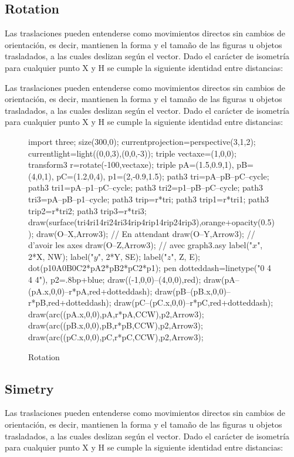 \documentclass[a4paper]{book}
\begin{document}
 \subsection{Rotation}

 Las traslaciones pueden entenderse como movimientos directos sin cambios de orientación, es decir, mantienen la forma y el tamaño de las figuras u objetos trasladados, a las cuales deslizan según el vector. Dado el carácter de isometría para cualquier punto X y H se cumple la siguiente identidad entre distancias:

 Las traslaciones pueden entenderse como movimientos directos sin cambios de orientación, es decir, mantienen la forma y el tamaño de las figuras u objetos trasladados, a las cuales deslizan según el vector. Dado el carácter de isometría para cualquier punto X y H se cumple la siguiente identidad entre distancias:

\begin{figure}[!ht]
	\centering
	\begin{asy}
	import three;
	size(300,0);
	currentprojection=perspective(3,1,2);
	currentlight=light((0,0,3),(0,0,-3));
	triple vectaxe=(1,0,0);
	transform3 r=rotate(-100,vectaxe);
	triple pA=(1.5,0.9,1), pB=(4,0,1), pC=(1.2,0,4), p1=(2,-0.9,1.5);
	path3 tri=pA--pB--pC--cycle;
	path3 tri1=pA--p1--pC--cycle;
	path3 tri2=p1--pB--pC--cycle;
	path3 tri3=pA--pB--p1--cycle;
	path3 trip=r*tri;
	path3 trip1=r*tri1;
	path3 trip2=r*tri2;
	path3 trip3=r*tri3;
	draw(surface(tri^^tri1^^tri2^^tri3^^trip^^trip1^^trip2^^trip3),orange+opacity(0.5));
	draw(O--X,Arrow3); // En attendant
	draw(O--Y,Arrow3); // d’avoir les axes
	draw(O--Z,Arrow3); // avec graph3.asy
	label("$x$", 2*X, NW);
	label("$y$", 2*Y, SE);
	label("$z$", Z, E);
	dot(p1^^pA^^pB^^pC^^r*pA^^r*pB^^r*pC^^r*p1);
	pen dotteddash=linetype("0 4 4 4"),
	p2=.8bp+blue;
	draw((-1,0,0)--(4,0,0),red);
	draw(pA--(pA.x,0,0)--r*pA,red+dotteddash);
	draw(pB--(pB.x,0,0)--r*pB,red+dotteddash);
	draw(pC--(pC.x,0,0)--r*pC,red+dotteddash);
	draw(arc((pA.x,0,0),pA,r*pA,CCW),p2,Arrow3);
	draw(arc((pB.x,0,0),pB,r*pB,CCW),p2,Arrow3);
	draw(arc((pC.x,0,0),pC,r*pC,CCW),p2,Arrow3);
	\end{asy}
	\caption{Rotation}
\end{figure}

\subsection{Simetry}

Las traslaciones pueden entenderse como movimientos directos sin cambios de orientación, es decir, mantienen la forma y el tamaño de las figuras u objetos trasladados, a las cuales deslizan según el vector. Dado el carácter de isometría para cualquier punto X y H se cumple la siguiente identidad entre distancias:
\end{document}
